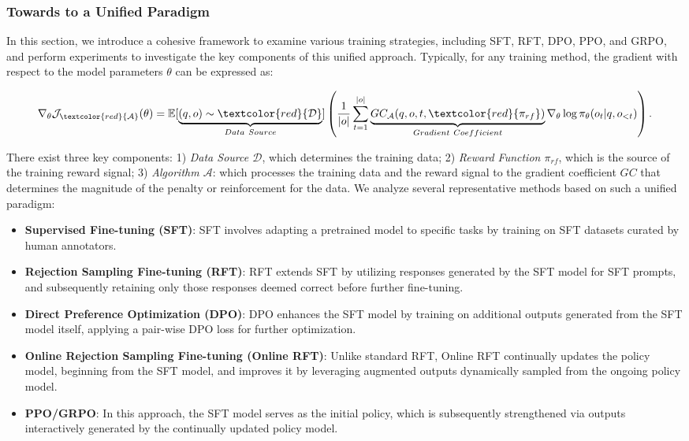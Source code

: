 \begin{itemize}[topsep=0pt]
\begin{itemize}[topsep=0pt]
\subsubsection{Towards to a Unified Paradigm} In this section, we introduce a cohesive framework to examine various training strategies, including SFT, RFT, DPO, PPO, and GRPO, and perform experiments to investigate the key components of this unified approach. Typically, for any training method, the gradient with respect to the model parameters $\theta$ can be expressed as:

\begin{equation}
    \nabla_{\theta}\mathcal{J}_{\textcolor{red}{\mathcal{A}}}(\theta) = \mathbb{E}[\underbrace{(q,o) \sim \textcolor{red}{\mathcal{D}}}_{Data \ Source}]\left( \frac{1}{|o|} \sum_{t=1}^{|o|}  \underbrace{GC_{{\mathcal{A}}}(q, o, t, \textcolor{red}{\pi_{{rf}}})}_{Gradient \ Coefficient}  \nabla_{\theta}\log \pi_{\theta}(o_t | q, o_{<t})\right).
\label{eq:objective}
\end{equation}

There exist three key components: 1) \textit{Data Source $\mathcal{D}$}, which determines the training data; 2) \textit{Reward Function $\pi_{{rf}}$}, which is the source of the training reward signal; 3) \textit{Algorithm $\mathcal{A}$}: which processes the training data and the reward signal to the gradient coefficient $GC$ that determines the magnitude of the penalty or reinforcement for the data. We analyze several representative methods based on such a unified paradigm:

\begin{itemize}
    \item  \textbf{Supervised Fine-tuning (SFT)}: SFT involves adapting a pretrained model to specific tasks by training on SFT datasets curated by human annotators.
    \item \textbf{Rejection Sampling Fine-tuning (RFT)}: RFT extends SFT by utilizing responses generated by the SFT model for SFT prompts, and subsequently retaining only those responses deemed correct before further fine-tuning.
    \item \textbf{Direct Preference Optimization (DPO)}: DPO enhances the SFT model by training on additional outputs generated from the SFT model itself, applying a pair-wise DPO loss for further optimization.
    \item \textbf{Online Rejection Sampling Fine-tuning (Online RFT)}: Unlike standard RFT, Online RFT continually updates the policy model, beginning from the SFT model, and improves it by leveraging augmented outputs dynamically sampled from the ongoing policy model.
    \item \textbf{PPO/GRPO}: In this approach, the SFT model serves as the initial policy, which is subsequently strengthened via outputs interactively generated by the continually updated policy model.
\end{itemize}


\end{itemize}
\end{itemize}
